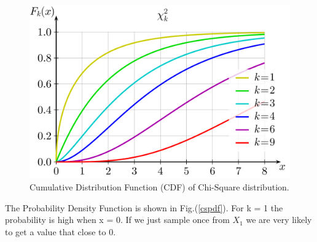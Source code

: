 \begin{figure}[h!]
\begin{center}
	\includegraphics[scale=0.07]{cs_cdf.png}
	\caption[]{Cumulative Distribution Function (CDF) of Chi-Square distribution.}
	\label{cscdf}
	\end{center}
	\end{figure}

The Probability Density Function is shown in Fig.(\ref{cspdf}). For k = 1 the probability is high when x = 0. If we just sample once from $X_1$ we are very likely to get a value that close to 0. 















